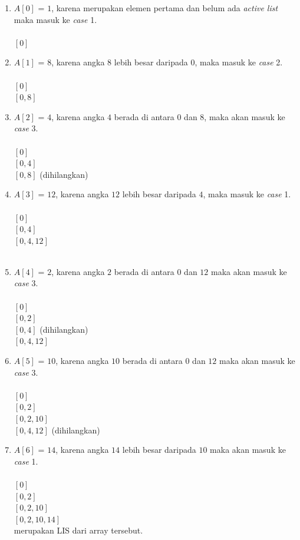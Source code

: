 \documentclass[a4paper]{IEEEtran}
\begin{document}
\begin{enumerate}
	\item $A[0]$ = $1$, karena merupakan elemen pertama dan belum ada \textit{active list} maka masuk ke \textit{case} 1.\\\\
	$[0]$\\
	\item $A[1]$ = $8$, karena angka $8$ lebih besar daripada $0$, maka masuk ke \textit{case} 2.\\\\
	$[0]$\\
	$[0,8]$\\
	\item $A[2]$ = $4$, karena angka $4$ berada di antara $0$ dan $8$, maka akan masuk ke \textit{case} 3.\\\\
	$[0]$\\
	$[0,4]$\\
	\sout{$[0,8]$} (dihilangkan)\\
	\item $A[3]$ = $12$, karena angka $12$ lebih besar daripada $4$, maka masuk ke \textit{case} 1.\\\\
	$[0]$\\
	$[0,4]$\\
	$[0,4,12]$\\\\
	\item $A[4]$ = $2$, karena angka $2$ berada di antara $0$ dan $12$ maka akan masuk ke \textit{case} 3.\\\\
	$[0]$\\
	$[0,2]$\\
	\sout{$[0,4]$} (dihilangkan)\\
	$[0,4,12]$\\
	\item $A[5]$ = $10$, karena angka $10$ berada di antara $0$ dan $12$ maka akan masuk ke \textit{case} 3.\\\\
	$[0]$\\
	$[0,2]$\\
	$[0,2,10]$\\
	\sout{$[0,4,12]$} (dihilangkan)\\
	\item $A[6]$ = $14$, karena angka $14$ lebih besar daripada $10$ maka akan masuk ke \textit{case} 1.\\\\
	$[0]$\\
	$[0,2]$\\
	$[0,2,10]$\\
	$[0,2,10,14]$\\ merupakan LIS dari array tersebut.
\end{enumerate}
\end{document}

